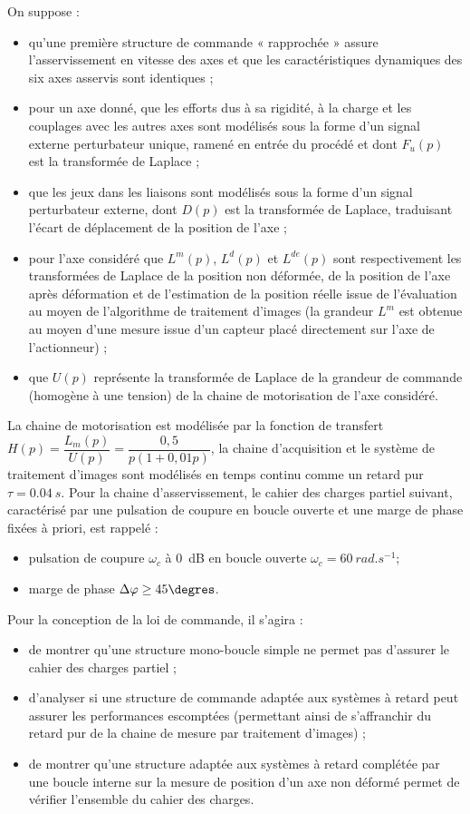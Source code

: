 On suppose :
\begin{itemize}
\item qu’une première structure de commande « rapprochée » assure l’asservissement en vitesse des axes et que les caractéristiques dynamiques des six axes asservis sont identiques ;
\item pour un axe donné, que les efforts dus à sa rigidité, à la charge et les couplages avec les autres axes sont modélisés sous la forme d’un signal externe perturbateur unique, ramené en entrée du procédé et dont $F_u(p)$ est la transformée de Laplace ;
\item que les jeux dans les liaisons sont modélisés sous la forme d’un signal perturbateur externe, dont $D(p)$ est la transformée de Laplace, traduisant l’écart de déplacement de la position de l’axe ;
\item pour l’axe considéré que $L^m(p)$, $L^d(p)$ et $L^{de}(p)$ sont respectivement les transformées de Laplace de la position non déformée, de la position de l’axe après déformation et de l’estimation de la position réelle issue de l’évaluation au moyen de l’algorithme de traitement d’images (la grandeur $L^m$ est obtenue au moyen d’une mesure issue d’un capteur placé directement sur l’axe de l’actionneur) ;
\item que $U(p)$ représente la transformée de Laplace de la grandeur de commande (homogène à une tension) de la chaine de motorisation de l’axe considéré.
\end{itemize}



La chaine de motorisation est modélisée par la fonction de transfert $H(p)=\dfrac{L_m(p)}{U(p)}=\dfrac{0,5}{p\left( 1+0,01 p\right)}$, la chaine d'acquisition et le système de traitement d’images sont modélisés en temps continu comme un retard pur $\tau=\SI{0,04}{s}$.
Pour la chaine d’asservissement, le cahier des charges partiel suivant, caractérisé par une pulsation de coupure en boucle ouverte et une marge de phase fixées à priori, est rappelé :
\begin{itemize}
\item pulsation de coupure $\omega_c$ à \SI{0}{dB} en boucle ouverte $\omega_c = \SI{60}{rad.s^{-1}}$;
\item marge de phase $\Delta \varphi \geq 45 \degres$.
\end{itemize}


Pour la conception de la loi de commande, il s’agira :
\begin{itemize}
\item de montrer qu’une structure mono-boucle simple ne permet pas d’assurer le cahier des charges partiel ;
\item d’analyser si une structure de commande adaptée aux systèmes à retard peut assurer les performances
escomptées (permettant ainsi de s’affranchir du retard pur de la chaine de mesure par traitement d’images) ;
\item de montrer qu’une structure adaptée aux systèmes à retard complétée par une boucle interne sur la mesure
de position d’un axe non déformé permet de vérifier l’ensemble du cahier des charges.
\end{itemize}

